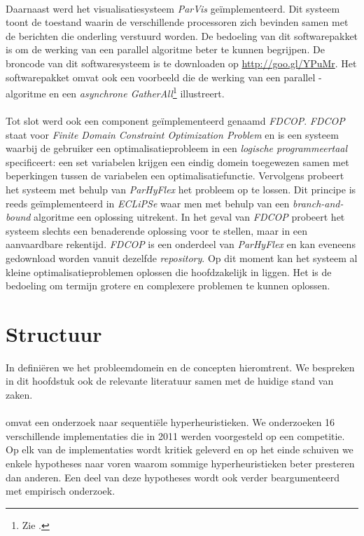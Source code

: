 \paragraph{}
Daarnaast werd het visualisatiesysteem \emph{ParVis} ge\"implementeerd. Dit systeem toont de toestand waarin de verschillende processoren zich bevinden samen met de berichten die onderling verstuurd worden. De bedoeling van dit softwarepakket is om de werking van een parallel algoritme beter te kunnen begrijpen. De broncode van dit softwaresysteem is te downloaden op \url{http://goo.gl/YPuMr}. Het softwarepakket omvat ook een voorbeeld die de werking van een parallel -algoritme en een \emph{asynchrone GatherAll}\footnote{Zie .} illustreert.

\paragraph{}
Tot slot werd ook een component ge\"implementeerd genaamd \emph{FDCOP}. \emph{FDCOP} staat voor \emph{Finite Domain Constraint Optimization Problem} en is een systeem waarbij de gebruiker een optimalisatieprobleem in een \emph{logische programmeertaal} specificeert: een set variabelen krijgen een eindig domein toegewezen samen met beperkingen tussen de variabelen een optimalisatiefunctie. Vervolgens probeert het systeem met behulp van \emph{ParHyFlex} het probleem op te lossen. Dit principe is reeds ge\"implementeerd in \emph{ECLiPSe} waar men met behulp van een \emph{branch-and-bound} algoritme een oplossing uitrekent. In het geval van \emph{FDCOP} probeert het systeem slechts een benaderende oplossing voor te stellen, maar in een aanvaardbare rekentijd. \emph{FDCOP} is een onderdeel van \emph{ParHyFlex} en kan eveneens gedownload worden vanuit dezelfde \emph{repository}. Op dit moment kan het systeem al kleine optimalisatieproblemen oplossen die hoofdzakelijk in  liggen. Het is de bedoeling om termijn grotere en complexere problemen te kunnen oplossen.


\section{Structuur}
In  defini\"eren we het probleemdomein en de concepten hieromtrent. We bespreken in dit hoofdstuk ook de relevante literatuur samen met de huidige stand van zaken.

\paragraph{}
 omvat een onderzoek naar sequenti\"ele hyperheuristieken. We onderzoeken 16 verschillende implementaties die in 2011 werden voorgesteld op een competitie. Op elk van de implementaties wordt kritiek geleverd en op het einde schuiven we enkele hypotheses naar voren waarom sommige hyperheuristieken beter presteren dan anderen. Een deel van deze hypotheses wordt ook verder beargumenteerd met empirisch onderzoek.

